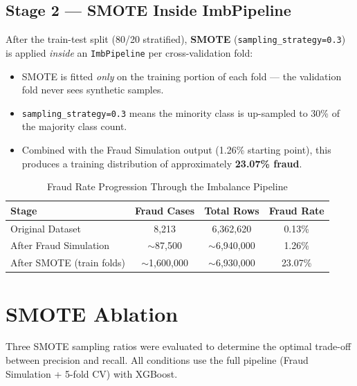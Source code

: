 \documentclass[12pt,a4paper]{article}
\begin{document}
\subsection{Stage 2 --- SMOTE Inside ImbPipeline}

After the train-test split (80/20 stratified), \textbf{SMOTE} (\texttt{sampling\_strategy=0.3}) is applied \emph{inside} an \texttt{ImbPipeline} per cross-validation fold:

\begin{itemize}[noitemsep]
  \item SMOTE is fitted \emph{only} on the training portion of each fold --- the validation fold never sees synthetic samples.
  \item \texttt{sampling\_strategy=0.3} means the minority class is up-sampled to 30\% of the majority class count.
  \item Combined with the Fraud Simulation output (1.26\% starting point), this produces a training distribution of approximately \textbf{23.07\% fraud}.
\end{itemize}

\begin{table}[H]
\centering
\caption{Fraud Rate Progression Through the Imbalance Pipeline}
\label{tab:fraud_progression}
\begin{tabular}{lccc}
\toprule
\textbf{Stage} & \textbf{Fraud Cases} & \textbf{Total Rows} & \textbf{Fraud Rate} \\
\midrule
Original Dataset & 8,213 & 6,362,620 & 0.13\% \\
After Fraud Simulation & $\sim$87,500 & $\sim$6,940,000 & 1.26\% \\
After SMOTE (train folds) & $\sim$1,600,000 & $\sim$6,930,000 & 23.07\% \\
\bottomrule
\end{tabular}
\end{table}

\section{SMOTE Ablation}

\label{sec:smote_ablation}

Three SMOTE sampling ratios were evaluated to determine the optimal trade-off between precision and recall. All conditions use the full pipeline (Fraud Simulation + 5-fold CV) with XGBoost.
\end{document}
